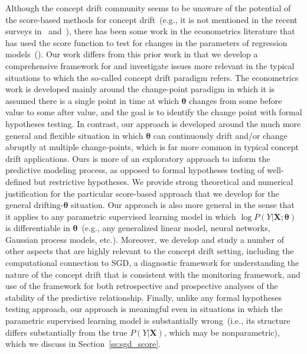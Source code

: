 \documentclass[twoside,11pt]{article}
\begin{document}
Although the concept drift community seems to be unaware of the potential of the score-based methods for concept drift~(e.g., it is not mentioned in the recent surveys in~\cite{barros2018large} and~\cite{lu2018learning}), there has been some work in the econometrics literature that has used the score function to test for changes in the parameters of regression models~(\cite{kuan1995generalized,zeileis2005unified,zeileis2007generalized,xia2009monitoring}). Our work differs from this prior work in that we develop a comprehensive framework for and investigate issues more relevant in the typical situations to which the so-called concept drift paradigm refers. The econometrics work is developed mainly around the change-point paradigm in which it is assumed there is a single point in time at which $\bm{\theta}$ changes from some before value to some after value, and the goal is to identify the change point with formal hypotheses testing. In contrast, our approach is developed around the much more general and flexible situation in which $\bm{\theta}$ can continuously drift and/or change abruptly at multiple change-points, which is far more common in typical concept drift applications. Ours is more of an exploratory approach to inform the predictive modeling process, as opposed to formal hypotheses testing of well-defined but restrictive hypotheses. We provide strong theoretical and numerical justification for the particular score-based approach that we develop for the general drifting-$\bm{\theta}$ situation. Our approach is also more general in the sense that it applies to any parametric supervised learning model in which $\log{P(Y|\bm{X};\bm{\theta})}$ is differentiable in $\bm{\theta}$~(e.g., any generalized linear model, neural networks, Gaussian process models, etc.). Moreover, we develop and study a number of other aspects that are highly relevant to the concept drift setting, including the computational connection to SGD, a diagnostic framework for understanding the nature of the concept drift that is consistent with the monitoring framework, and use of the framework for both retrospective and prospective analyses of the stability of the predictive relationship. Finally, unlike any formal hypotheses testing approach, our approach is meaningful even in situations in which the parametric supervised learning model is substantially wrong~(i.e., its structure differs substantially from the true $P(Y|\bm{X})$, which may be nonparametric), which we discuss in Section~\ref{ss:sgd_score}.
\end{document}
